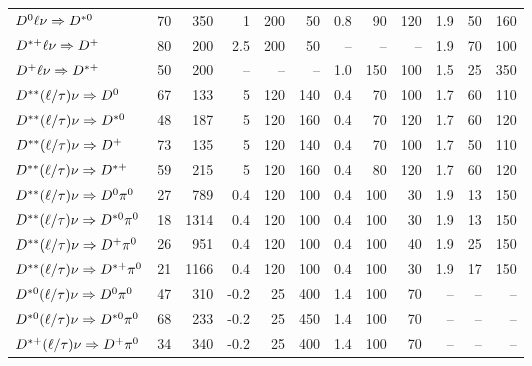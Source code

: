 \documentclass[6pt]{article}
\begin{document}
\begin{tabular}{l r r r r r r r r r r r}
$D^0\ell\nu\Rightarrow D^{*0}                 $   &    70    &  350   &  1     &  200 &   50  &  0.8    &  90   & 120   &  1.9    & 50  & 160  \\ 
$D^{*+}\ell\nu\Rightarrow D^+                 $   &    80    &  200   &  2.5   &  200 &   50  &  --     &  --   & --    &  1.9    & 70  & 100  \\ 
$D^+\ell\nu\Rightarrow D^{*+}                 $   &    50    &  200   &  --    &  --  &  --   &  1.0    &  150  &  100  &  1.5    & 25  & 350  \\ 
$D^{**}(\ell/\tau)\nu\Rightarrow D^0         $   &    67    &  133   &  5     &  120 &  140  &  0.4    &  70   & 100   &  1.7    & 60  & 110  \\ 
$D^{**}(\ell/\tau)\nu\Rightarrow D^{*0}     $   &    48    &  187   &  5     &  120 &  160  &  0.4    &  70   & 120   &  1.7    & 60  & 120  \\ 
$D^{**}(\ell/\tau)\nu\Rightarrow D^+         $   &    73    &  135   &  5     &  120 &  140  &  0.4    &  70   & 100   &  1.7    & 50  & 110  \\ 
$D^{**}(\ell/\tau)\nu\Rightarrow D^{*+}     $   &    59    &  215   &  5     &  120 &  160  &  0.4    &  80   & 120   &  1.7    & 60  & 120  \\ \hline 
$D^{**}(\ell/\tau)\nu\Rightarrow D^0\pi^0     $   &    27    &  789   &  0.4   &  120 &  100  &  0.4    &  100  &  30   &  1.9    & 13  & 150  \\ 
$D^{**}(\ell/\tau)\nu\Rightarrow D^{*0}\pi^0 $   &    18    &  1314  &  0.4   &  120 &  100  &  0.4    &  100  &  30   &  1.9    & 13  & 150  \\ 
$D^{**}(\ell/\tau)\nu\Rightarrow D^+\pi^0     $   &    26    &  951   &  0.4   &  120 &  100  &  0.4    &  100  &  40   &  1.9    & 25  & 150  \\ 
$D^{**}(\ell/\tau)\nu\Rightarrow D^{*+}\pi^0 $   &    21    &  1166  &  0.4   &  120 &  100  &  0.4    &  100  &  30   &  1.9    & 17  & 150  \\ 
$D^{*0}(\ell/\tau)\nu\Rightarrow D^0\pi^0      $   &    47    &  310   &  -0.2  &   25 &  400  &  1.4    &  100  &  70   &  --     & --  & --   \\ 
$D^{*0}(\ell/\tau)\nu\Rightarrow D^{*0}\pi^0  $   &    68    &  233   &  -0.2  &   25 &  450  &  1.4    &  100  &  70   &  --     & --  & --   \\ 
$D^{*+}(\ell/\tau)\nu\Rightarrow D^+\pi^0      $   &    34    &  340   &  -0.2  &   25 &  400  &  1.4    &  100  &  70   &  --     & --  & --   \\ 

\end{tabular}
\end{document}
